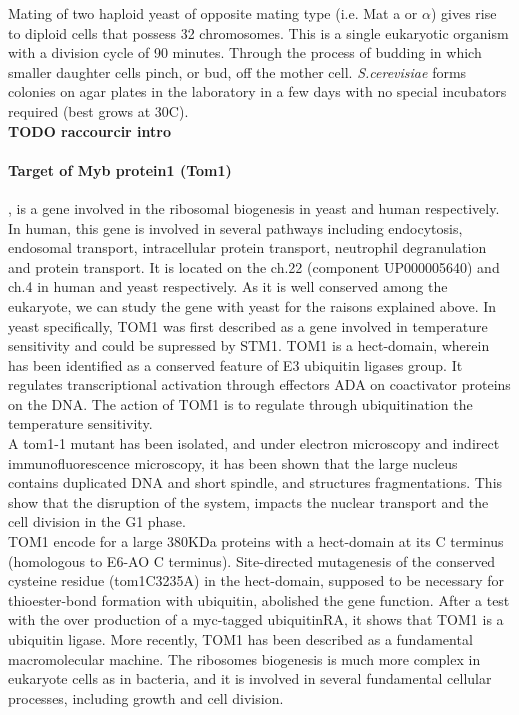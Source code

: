 \documentclass[10pt,a4paper]{article}
\begin{document}
\noindent Mating of two haploid yeast of opposite mating type (i.e. Mat a or $\alpha $) gives rise to diploid cells that possess 32 chromosomes. This is a single eukaryotic organism with a division cycle of 90 minutes. Through the process of budding in which smaller daughter cells pinch, or bud, off the mother cell. \textit{S.cerevisiae} forms colonies on agar plates in the laboratory in a few days with no special incubators required (best grows at 30\degree C).\\


\textbf{TODO raccourcir intro}

\paragraph{Target of Myb protein1 (Tom1)}, is a gene involved in the ribosomal biogenesis in yeast and human respectively. In human, this gene is involved in several pathways including endocytosis, endosomal transport, intracellular protein transport, neutrophil degranulation and protein transport\cite{seroussi_tom1genes_1999,seet_endofin_2004}. It is located on the ch.22 (component UP000005640) and ch.4 in human and yeast respectively. As it is well conserved among the eukaryote, we can study the gene with yeast for the raisons explained above. In yeast specifically, TOM1 was first described as a gene involved in temperature sensitivity and could be supressed by STM1\cite{utsugi_high_1995}. TOM1 is a hect-domain, wherein has been identified as a conserved feature of E3 ubiquitin ligases group. It regulates transcriptional activation through effectors ADA on coactivator proteins on the DNA. The action of TOM1 is to regulate through ubiquitination the temperature sensitivity\cite{saleh_tom1p_1998}. \\

\noindent A tom1-1 mutant has been isolated, and under electron microscopy and indirect immunofluorescence microscopy, it has been shown that the large nucleus contains duplicated DNA and short spindle, and structures fragmentations. This show that the disruption of the system, impacts the nuclear transport and the cell division in the G1 phase\cite{seet_endofin_2004,utsugi_yeast_1999}.\\ 
 

\noindent TOM1 encode for a large 380KDa proteins with a hect-domain at its C terminus (homologous to E6-AO C terminus). Site-directed mutagenesis of the conserved cysteine residue (tom1C3235A) in the hect-domain, supposed to be necessary for thioester-bond formation with ubiquitin, abolished the gene function. After a test with the over production of a myc-tagged ubiquitinRA, it shows that TOM1 is a ubiquitin ligase\cite{utsugi_yeast_1999}. More recently, TOM1 has been described as a fundamental macromolecular machine. The ribosomes biogenesis is much more complex in eukaryote cells as in bacteria, and it is involved in several fundamental cellular processes, including growth and cell division\cite{dinman_eukaryotic_2009}.\\
\end{document}
